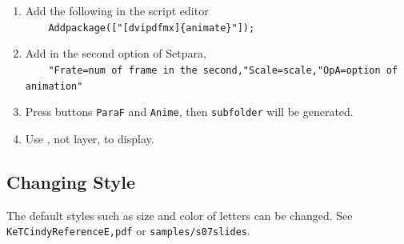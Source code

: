 \documentclass[papersize,a4paper,12pt]{article}
\begin{document}
\begin{enumerate}[1)]
\item Add the following in the script editor\\ 
\verb|    Addpackage(["[dvipdfmx]{animate}"]);|
\item Add in the second option of Setpara,\\
\verb|    "Frate=num of frame in the second,"Scale=scale,"OpA=option of animation" |
\item Press buttons \verb|ParaF| and \verb|Anime|, then \verb|subfolder| will be generated.
\item Use \verb||, not layer, to display.
\end{enumerate}

\subsection{Changing Style}

The default styles such as size and color of letters can be changed.
See \verb|KeTCindyReferenceE,pdf| or \verb|samples/s07slides|.
\end{document}
